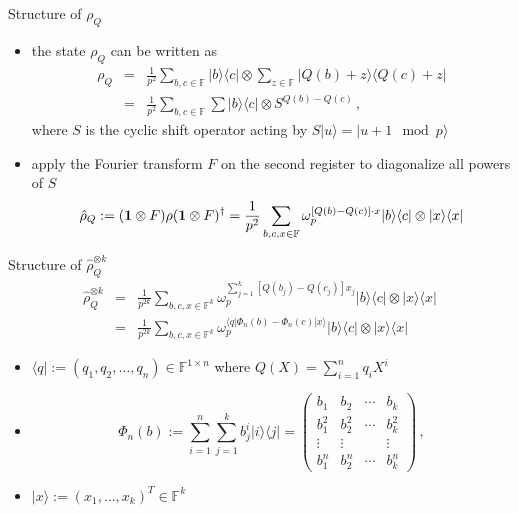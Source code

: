 \documentclass[slideColor]{prosper}
\newcommand{\F}{{\mathbb{F}}}
\renewcommand{\>}{\rangle}
\newcommand{\<}{\langle}
\begin{document}
\begin{slide}{Structure of $\rho_Q$}
\begin{itemize}
\item the state $\rho_Q$ can be written as
\begin{eqnarray*}
\rho_Q & = & 
\frac{1}{p^2} \sum_{b,c\in\F} |b\>\<c| \otimes \sum_{z\in\F} |Q(b)+z\>\<Q(c)+z| \\
& = & 
\frac{1}{p^2} \sum_{b,c\in\F} \sum|b\>\<c| \otimes S^{Q(b)-Q(c)}\,,
\end{eqnarray*}
where $S$ is the cyclic shift operator acting by $S|u\>=|u+1 \mod p\>$
\item apply the Fourier transform $F$ on the second register to diagonalize all powers of $S$
\[
\hat{\rho}_Q := 
({\bf 1} \otimes F) \rho ({\bf 1} \otimes F)^\dagger
=
\frac{1}{p^2} \sum_{b,c,x\in\F} \omega_p^{[Q(b)-Q(c)]\cdot x} |b\>\<c| \otimes |x\>\<x|
\]
\end{itemize}
\end{slide}


\begin{slide}{Structure of $\hat{\rho}_Q^{\otimes k}$}
\vspace{-0.5cm}
\begin{eqnarray*}
\hat{\rho}_Q^{\otimes k} & = & 
\frac{1}{p^{2k}}
\sum_{b,c,x\in\F^k} \omega_p^{\sum_{j=1}^k [Q(b_j)-Q(c_j)] x_j}
|b\>\<c| \otimes |x\>\<x| \\
& = &
\frac{1}{p^{2k}} \sum_{b,c,x\in\F^k}
\omega_p^{\<q|\Phi_n(b) - \Phi_n(c)|x\>} |b\>\<c| \otimes
|x\>\<x|
\end{eqnarray*}
\begin{itemize}
\item $\<q|:=(q_1,q_2,\ldots,q_n) \in \F^{1 \times n}$ where $Q(X)=\sum_{i=1}^n q_i X^i$
\item 
\[
\Phi_n(b) := \sum_{i=1}^n \sum_{j=1}^k b_j^i |i\>\<j| = \left(
\begin{array}{cccc}
b_1    & b_2    & \cdots & b_k    \\
b_1^2  & b_2^2  & \cdots & b_k^2  \\
\vdots & \vdots &        & \vdots \\
b_1^n  & b_2^n  & \cdots & b_k^n  
\end{array}
\right)\,,
\]
\item \vspace{-0.2cm} $|x\>:=(x_1,\ldots,x_k)^T \in \F^k$
\end{itemize}
\end{slide}
\end{document}
